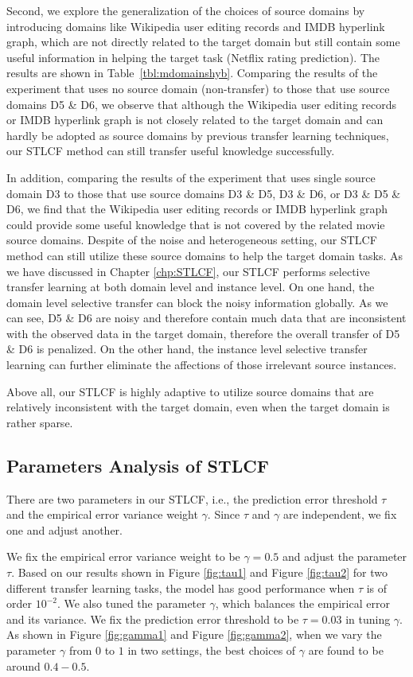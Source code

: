 Second, we explore the generalization of the choices of source domains by introducing domains like Wikipedia user editing records and IMDB hyperlink graph, which are not directly related to the target domain but still contain some useful information in helping the target task (Netflix rating prediction). The results are shown in Table~\ref{tbl:mdomainshyb}.
Comparing the results of the experiment that uses no source domain (non-transfer) to those that use source domains D5 \& D6, we observe that although the Wikipedia user editing records or IMDB hyperlink graph is not closely related to the target domain and can hardly be adopted as source domains by previous transfer learning techniques, our STLCF method can still transfer useful knowledge successfully.

In addition, comparing the results of the experiment that uses single source domain D3 to those that use source domains D3 \& D5, D3 \& D6, or D3 \& D5 \& D6, we find that the Wikipedia user editing records or IMDB hyperlink graph could provide some useful knowledge that is not covered by the related movie source domains. Despite of the noise and heterogeneous setting, our STLCF method can still utilize these source domains to help the target domain tasks. As we have discussed in Chapter \ref{chp:STLCF}, our STLCF performs selective transfer learning at both domain level and instance level.
On one hand, the domain level selective transfer can block the noisy information globally. As we can see, D5 \& D6 are noisy and therefore contain much data that are inconsistent with the observed data in the target domain, therefore the overall transfer of D5 \& D6 is penalized.
On the other hand, the instance level selective transfer learning can further eliminate the affections of those irrelevant source instances.

Above all, our STLCF is highly adaptive to utilize source domains that are relatively inconsistent with the target domain, even when the target domain is rather sparse.

\hspace{0.05in}
\subsection{Parameters Analysis of STLCF}
There are two parameters in our STLCF, i.e., the prediction error threshold $\tau$ and the empirical error variance weight $\gamma$.
Since $\tau$ and $\gamma$ are independent, we fix one and adjust another.

We fix the empirical error variance weight to be $\gamma=0.5$ and adjust the parameter $\tau$. Based on our results shown in Figure \ref{fig:tau1} and Figure \ref{fig:tau2} for two different transfer learning tasks, the model has good performance when $\tau$ is of order $10^{-2}$.
We also tuned the parameter $\gamma$, which balances the empirical error and its variance. We fix the prediction error threshold to be $\tau=0.03$ in tuning $\gamma$. As shown in Figure \ref{fig:gamma1} and Figure \ref{fig:gamma2}, when we vary the parameter $\gamma$ from $0$ to $1$ in two settings, the best choices of $\gamma$ are found to be around $0.4-0.5$.

